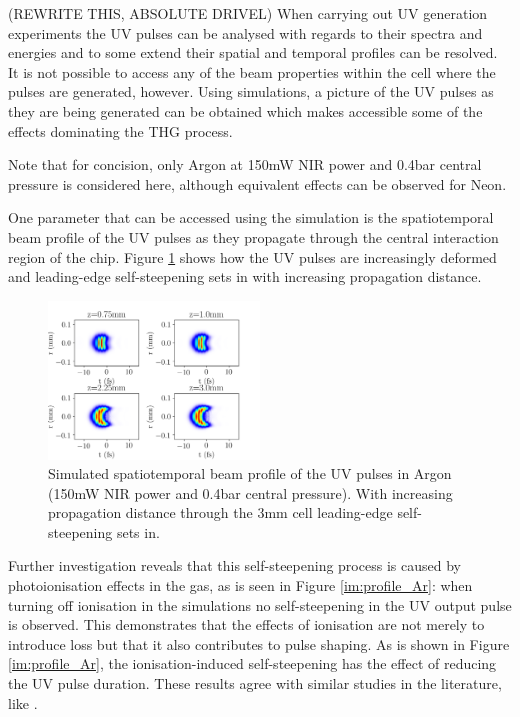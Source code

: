 \documentclass[a4paper]{jpconf}
\begin{document}
(REWRITE THIS, ABSOLUTE DRIVEL)
When carrying out UV generation experiments the UV pulses can be analysed with regards to their spectra and energies and to some extend their spatial and temporal profiles can be  resolved. It is not possible to access any of the beam properties within the cell where the pulses are generated, however. Using simulations, a picture of the UV pulses as they are being generated can be obtained which makes accessible some of the effects dominating the THG process. \par 
Note that for concision, only Argon at 150mW NIR power and 0.4bar central pressure is considered here, although equivalent effects can be observed for Neon. 
\par 
One parameter that can be accessed using the simulation is the spatiotemporal beam profile of the UV pulses as they propagate through the central interaction region of the chip. Figure \ref{im:prop} shows how the UV pulses are increasingly deformed and leading-edge self-steepening sets in with increasing propagation distance. 
\begin{figure}[h]
\centering
\includegraphics[width=0.5\textwidth]{im/UV_pulse_evolution_Ar_ion}
\caption{Simulated spatiotemporal beam profile of the UV pulses in Argon (150mW NIR power and 0.4bar central pressure). With increasing propagation distance through the 3mm cell leading-edge self-steepening sets in.}\label{im:prop}
\end{figure}
Further investigation reveals that this self-steepening process is  caused by photoionisation effects in the gas, as is seen in Figure \ref{im:profile_Ar}: when turning off ionisation in the simulations no self-steepening in the UV output pulse is observed. This demonstrates that the effects of ionisation are not merely to introduce loss but that it also contributes to pulse shaping. As is shown in Figure \ref{im:profile_Ar}, the ionisation-induced self-steepening has the effect of reducing the UV pulse duration. These results agree with similar studies in the literature, like \cite{reiter2010}. \par 
\end{document}
